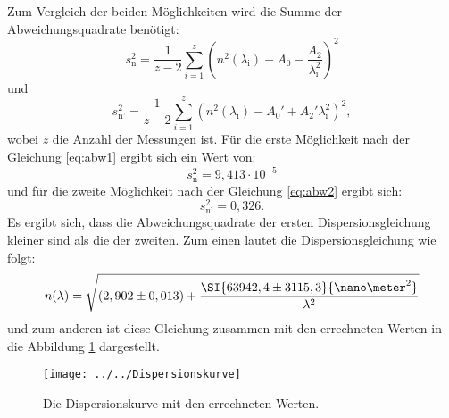 Zum Vergleich der beiden Möglichkeiten wird die Summe der Abweichungsquadrate benötigt:
\begin{equation}
\label{eq:abw1}
s_\text{n}^2 = \frac{1}{z-2} \sum_{i=1}^{z}   \left(n^2(\lambda_\text{i}) - A_0 -\frac{A_2}{\lambda_\text{i}^2}\right)^2
\end{equation}
und 
\begin{equation}
\label{eq:abw2}
s_\text{n'}^2 = \frac{1}{z-2} \sum_{i=1}^{z}   \left(n^2(\lambda_\text{i}) - A_0' + A_2'\lambda_\text{i}^2\right)^2,
\end{equation}
wobei $z$ die Anzahl der Messungen ist. Für die erste Möglichkeit nach der Gleichung \ref{eq:abw1} ergibt sich ein Wert von:
\begin{equation*}
s_\text{n}^2 = 9,413 \cdot 10^{-5}
\end{equation*}
und für die zweite Möglichkeit nach der Gleichung \ref{eq:abw2} ergibt sich:
\begin{equation*}
s_\text{n'}^2 = 0,326.
\end{equation*}
Es ergibt sich, dass die Abweichungsquadrate der ersten Dispersionsgleichung kleiner sind als die der zweiten. Zum einen lautet die Dispersionsgleichung wie folgt:
\begin{equation}
\label{eq:dispersionsgleichung}
n(\lambda) = \sqrt{(2,902 \pm 0,013) + \frac{\SI{63942,4 \pm 3115,3}{\nano\meter^{2}}}{\lambda^{2}}}
\end{equation}
und zum anderen ist diese Gleichung zusammen mit den errechneten Werten in die Abbildung \ref{fig:dispersionskurve}  dargestellt.
\begin{figure}[h!]
	\centering
	\texttt{[image: ../../Dispersionskurve]}
	\caption{Die Dispersionskurve mit den errechneten Werten.}
	\label{fig:dispersionskurve}
\end{figure}

